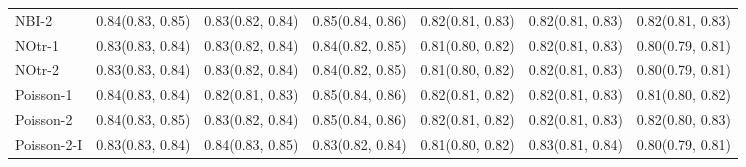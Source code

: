 \begin{tabular}{l p{} p{} p{} p{} p{} p{}}
NBI-2 & {0.84\newline(0.83, 0.85)} & {0.83\newline(0.82, 0.84)} & {0.85\newline(0.84, 0.86)} & {0.82\newline(0.81, 0.83)} & {0.82\newline(0.81, 0.83)} & {0.82\newline(0.81, 0.83)} \\
NOtr-1 & {0.83\newline(0.83, 0.84)} & {0.83\newline(0.82, 0.84)} & {0.84\newline(0.82, 0.85)} & {0.81\newline(0.80, 0.82)} & {0.82\newline(0.81, 0.83)} & {0.80\newline(0.79, 0.81)} \\
NOtr-2 & {0.83\newline(0.83, 0.84)} & {0.83\newline(0.82, 0.84)} & {0.84\newline(0.82, 0.85)} & {0.81\newline(0.80, 0.82)} & {0.82\newline(0.81, 0.83)} & {0.80\newline(0.79, 0.81)} \\
Poisson-1 & {0.84\newline(0.83, 0.84)} & {0.82\newline(0.81, 0.83)} & {0.85\newline(0.84, 0.86)} & {0.82\newline(0.81, 0.82)} & {0.82\newline(0.81, 0.83)} & {0.81\newline(0.80, 0.82)} \\
Poisson-2 & {0.84\newline(0.83, 0.85)} & {0.83\newline(0.82, 0.84)} & {0.85\newline(0.84, 0.86)} & {0.82\newline(0.81, 0.82)} & {0.82\newline(0.81, 0.83)} & {0.82\newline(0.80, 0.83)} \\
Poisson-2-I & {0.83\newline(0.83, 0.84)} & {0.84\newline(0.83, 0.85)} & {0.83\newline(0.82, 0.84)} & {0.81\newline(0.80, 0.82)} & {0.83\newline(0.81, 0.84)} & {0.80\newline(0.79, 0.81)} \\

\end{tabular}
